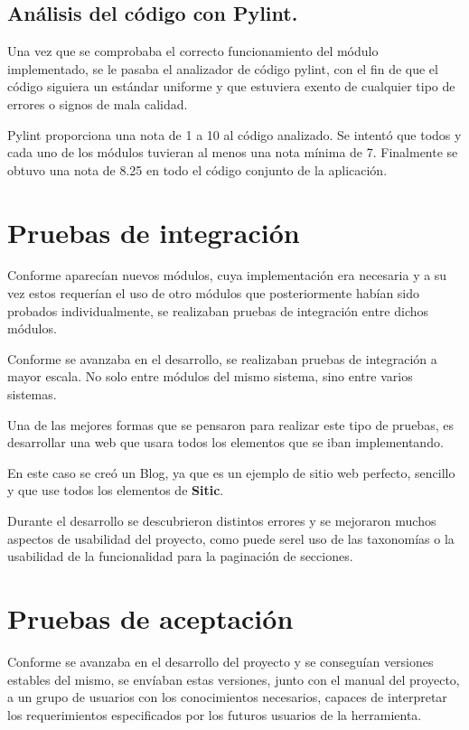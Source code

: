 \subsection{Análisis del código con Pylint.}

Una vez que se comprobaba el correcto funcionamiento del módulo implementado, se le pasaba el analizador de código pylint, con el
fin de que el código siguiera un estándar uniforme y que estuviera exento de cualquier tipo de errores o signos de mala calidad.

Pylint proporciona una nota de 1 a 10 al código analizado. Se intentó que todos y cada uno de los módulos tuvieran al menos
una nota mínima de 7. Finalmente se obtuvo una nota de 8.25 en todo el código conjunto de la aplicación.

\section{Pruebas de integración}

Conforme aparecían nuevos módulos, cuya implementación era necesaria y a su vez estos requerían el uso de otro módulos que
posteriormente habían sido probados individualmente, se realizaban pruebas de integración entre dichos módulos.

Conforme se avanzaba en el desarrollo, se realizaban pruebas de integración a mayor escala. No solo entre módulos
del mismo sistema, sino entre varios sistemas.

Una de las mejores formas que se pensaron para realizar este tipo de pruebas, es desarrollar una web que usara todos los elementos
que se iban implementando.

En este caso se creó un Blog, ya que es un ejemplo de sitio web perfecto, sencillo y que use 
todos los elementos de \textbf{Sitic}.

Durante el desarrollo se descubrieron distintos errores y se mejoraron muchos aspectos de usabilidad del proyecto, 
como puede serel uso de las taxonomías o la usabilidad de la funcionalidad para la paginación de secciones.

\section{Pruebas de aceptación}

Conforme se avanzaba en el desarrollo del proyecto y se conseguían versiones estables del mismo, se
envíaban estas versiones, junto con el manual del proyecto, a un grupo de usuarios con los conocimientos
necesarios, capaces de interpretar los requerimientos especificados por los futuros usuarios de la herramienta.

